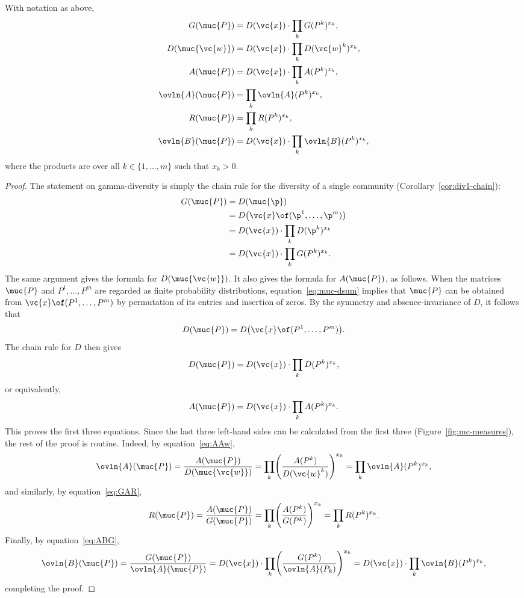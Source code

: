 \begin{propn}
%
%
% 
With notation as above, 
% 
\begin{align*}
G(\muc{P})      &
=
D(\vc{x}) \cdot \prod_k G(P^k)^{x_k},       \\
D(\muc{\vc{w}}) &
=
D(\vc{x}) \cdot \prod_k D(\vc{w}^k)^{x_k},  \\
A(\muc{P})      &
=
D(\vc{x}) \cdot \prod_k A(P^k)^{x_k},       \\
\ovln{A}(\muc{P})&
=
\prod_k \ovln{A}(P^k)^{x_k},    \\
R(\muc{P})      &
=
\prod_k R(P^k)^{x_k},   \\
\ovln{B}(\muc{P})       &
=
D(\vc{x}) \cdot \prod_k \ovln{B}(P^k)^{x_k},
\end{align*}
% 
where the products are over all $k \in \{1, \ldots, m\}$ such that $x_k >
0$.  
\end{propn}

\begin{proof}
The statement on gamma-diversity is simply the chain rule for the
diversity of a single community (Corollary~\ref{cor:div1-chain}):
% 
\begin{align*}
G(\muc{P})      &
=
D(\muc{\p})     \\
&
=
D\bigl(\vc{x} \of (\p^1, \ldots, \p^m)\bigr)    \\
&
=
D(\vc{x}) \cdot \prod_k D(\p^k)^{x_k}       \\
&
=
D(\vc{x}) \cdot \prod_k G(P^k)^{x_k}.
\end{align*}
% 
The same argument gives the formula for $D(\muc{\vc{w}})$.  It also gives
the formula for $A(\muc{P})$, as follows.  When the matrices $\muc{P}$ and
$P^1, \ldots, P^m$ are regarded as finite probability distributions,
equation~\eqref{eq:muc-dsum} implies that $\muc{P}$ can be obtained from $\vc{x} \of
(P^1, \ldots, P^m)$ by permutation of its entries and insertion of
zeros.  By the symmetry and absence-invariance of $D$, it follows that
\[
D(\muc{P}) = D\bigl( \vc{x} \of (P^1, \ldots, P^m) \bigr).
\]
The chain rule for $D$ then gives 
\[
D(\muc{P}) = 
D(\vc{x}) \cdot \prod_k D(P^k)^{x_k},
\]
or equivalently,
\[
A(\muc{P}) = 
D(\vc{x}) \cdot \prod_k A(P^k)^{x_k}.
\]
This proves the first three equations.  Since the last three left-hand
sides can be calculated from the first three
(Figure~\ref{fig:mc-measures}), the rest of the proof is routine. Indeed,
by equation~\eqref{eq:AAw},  
\[
\ovln{A}(\muc{P})
=
\frac{A(\muc{P})}{D(\muc{\vc{w}})}
=
\prod_k \Biggl( \frac{A(P^k)}{D(\vc{w}^k)} \Biggr)^{x_k}
=
\prod_k \ovln{A}(P^k)^{x_k},
\]
and similarly, by equation~\eqref{eq:GAR},
\[
R(\muc{P})
=
\frac{A(\muc{P})}{G(\muc{P})}
=
\prod_k \Biggl( \frac{A(P^k)}{G(P^k)} \Biggr)^{x_k}
=
\prod_k R(P^k)^{x_k}.
\]
Finally, by equation~\eqref{eq:ABG}, 
\[
\ovln{B}(\muc{P})
=
\frac{G(\muc{P})}{\ovln{A}(\muc{P})}
=
D(\vc{x}) \cdot \prod_k \Biggl( \frac{G(P^k)}{\ovln{A}(P_k)} \Biggr)^{x_k}
=
D(\vc{x}) \cdot \prod_k \ovln{B}(P^k)^{x_k},
\]
completing the proof.
\end{proof}

